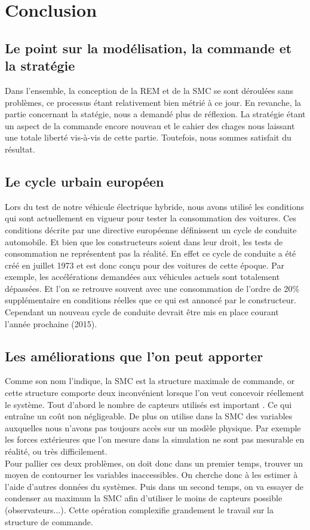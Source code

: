 \section{Conclusion}

\subsection{Le point sur la modélisation, la commande et la stratégie}

Dans l'ensemble, la conception de la REM et de la SMC se sont déroulées sans problèmes, ce processus étant relativement bien métrié à ce jour. En revanche, la partie concernant la statégie, nous a demandé plus de réflexion. La stratégie étant un aspect de la commande encore nouveau et le cahier des chages nous laissant une totale liberté vis-à-vis de cette partie. Toutefois, nous sommes satisfait du résultat. 

\subsection{Le cycle urbain européen}

Lors du test de notre véhicule électrique hybride, nous avons utilisé les conditions qui sont actuellement en vigueur pour tester la consommation des voitures. Ces conditions décrite par une directive européenne définissent un cycle de conduite automobile. Et bien que les constructeurs soient dans leur droit, les tests de consommation ne représentent pas la réalité. En effet ce cycle de conduite a été créé en juillet 1973 et est donc conçu pour des voitures de cette époque. Par exemple, les accélérations demandées aux véhicules actuels sont totalement dépassées. Et l'on se retrouve souvent avec une consommation de l'ordre de 20\% supplémentaire en conditions réelles que ce qui est annoncé par le constructeur. Cependant un nouveau cycle de conduite devrait être mis en place courant l'année prochaine (2015). 


\subsection{Les améliorations que l'on peut apporter}

Comme son nom l'indique, la SMC est la structure maximale de commande, or cette structure comporte deux inconvénient lorsque l'on veut concevoir réellement le système. Tout d'abord le nombre de capteurs utilisés est important . Ce qui entraîne un coût non négligeable. De plus on utilise dans la SMC des variables auxquelles nous n'avons pas toujours accès sur un modèle physique. Par exemple les forces extérieures que l'on mesure dans la simulation ne sont pas mesurable en réalité, ou très difficilement. \\

Pour pallier ces deux problèmes, on doit donc dans un premier temps, trouver un moyen de contourner les variables inaccessibles. On cherche donc à les estimer à l'aide d'autres données du systèmes. Puis dans un second temps, on va essayer de condenser au maximum la SMC afin d'utiliser le moins de capteurs possible (observateurs...). Cette opération complexifie grandement le travail sur la structure de commande. 